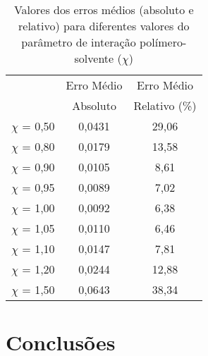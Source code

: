 \begin{table}[htb]
\centering
\renewcommand{\arraystretch}{1.3}
\caption{Valores dos erros médios (absoluto e relativo) para diferentes valores
do parâmetro de interação polímero-solvente ($\chi$)}
\begin{tabular}{ccc}
\toprule
& {Erro Médio} & {Erro Médio} 	\\
& {Absoluto} & {Relativo (\%)}	 \\
\midrule
{$\chi$} = 0,50 & 0,0431 & 29,06 \\
{$\chi$} = 0,80 & 0,0179 & 13,58 \\
{$\chi$} = 0,90 & 0,0105 & 8,61  \\
{$\chi$} = 0,95 & 0,0089 & 7,02  \\
{$\chi$} = 1,00 & 0,0092 & 6,38  \\
{$\chi$} = 1,05 & 0,0110 & 6,46  \\
{$\chi$} = 1,10 & 0,0147 & 7,81  \\
{$\chi$} = 1,20 & 0,0244 & 12,88 \\
{$\chi$} = 1,50 & 0,0643 & 38,34 \\
\bottomrule
\end{tabular}
\label{tab:allresult}
\end{table}

\section{Conclusões}